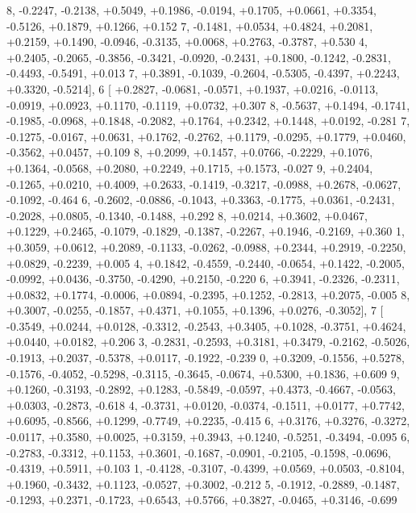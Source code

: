 \begin{DoxyCode}
      8, -0.2247, -0.2138, +0.5049, +0.1986, -0.0194, +0.1705, +0.0661, +0.3354, -0.5126, +0.1879, +0.1266, +0.152
      7, -0.1481, +0.0534, +0.4824, +0.2081, +0.2159, +0.1490, -0.0946, -0.3135, +0.0068, +0.2763, -0.3787, +0.530
      4, +0.2405, -0.2065, -0.3856, -0.3421, -0.0920, -0.2431, +0.1800, -0.1242, -0.2831, -0.4493, -0.5491, +0.013
      7, +0.3891, -0.1039, -0.2604, -0.5305, -0.4397, +0.2243, +0.3320, -0.5214],
6 [ +0.2827, -0.0681, -0.0571, +0.1937, +0.0216, -0.0113, -0.0919, +0.0923, +0.1170, -0.1119, +0.0732, +0.307
      8, -0.5637, +0.1494, -0.1741, -0.1985, -0.0968, +0.1848, -0.2082, +0.1764, +0.2342, +0.1448, +0.0192, -0.281
      7, -0.1275, -0.0167, +0.0631, +0.1762, -0.2762, +0.1179, -0.0295, +0.1779, +0.0460, -0.3562, +0.0457, +0.109
      8, +0.2099, +0.1457, +0.0766, -0.2229, +0.1076, +0.1364, -0.0568, +0.2080, +0.2249, +0.1715, +0.1573, -0.027
      9, +0.2404, -0.1265, +0.0210, +0.4009, +0.2633, -0.1419, -0.3217, -0.0988, +0.2678, -0.0627, -0.1092, -0.464
      6, -0.2602, -0.0886, -0.1043, +0.3363, -0.1775, +0.0361, -0.2431, -0.2028, +0.0805, -0.1340, -0.1488, +0.292
      8, +0.0214, +0.3602, +0.0467, +0.1229, +0.2465, -0.1079, -0.1829, -0.1387, -0.2267, +0.1946, -0.2169, +0.360
      1, +0.3059, +0.0612, +0.2089, -0.1133, -0.0262, -0.0988, +0.2344, +0.2919, -0.2250, +0.0829, -0.2239, +0.005
      4, +0.1842, -0.4559, -0.2440, -0.0654, +0.1422, -0.2005, -0.0992, +0.0436, -0.3750, -0.4290, +0.2150, -0.220
      6, +0.3941, -0.2326, -0.2311, +0.0832, +0.1774, -0.0006, +0.0894, -0.2395, +0.1252, -0.2813, +0.2075, -0.005
      8, +0.3007, -0.0255, -0.1857, +0.4371, +0.1055, +0.1396, +0.0276, -0.3052],
7 [ -0.3549, +0.0244, +0.0128, -0.3312, -0.2543, +0.3405, +0.1028, -0.3751, +0.4624, +0.0440, +0.0182, +0.206
      3, -0.2831, -0.2593, +0.3181, +0.3479, -0.2162, -0.5026, -0.1913, +0.2037, -0.5378, +0.0117, -0.1922, -0.239
      0, +0.3209, -0.1556, +0.5278, -0.1576, -0.4052, -0.5298, -0.3115, -0.3645, -0.0674, +0.5300, +0.1836, +0.609
      9, +0.1260, -0.3193, -0.2892, +0.1283, -0.5849, -0.0597, +0.4373, -0.4667, -0.0563, +0.0303, -0.2873, -0.618
      4, -0.3731, +0.0120, -0.0374, -0.1511, +0.0177, +0.7742, +0.6095, -0.8566, +0.1299, -0.7749, +0.2235, -0.415
      6, +0.3176, +0.3276, -0.3272, -0.0117, +0.3580, +0.0025, +0.3159, +0.3943, +0.1240, -0.5251, -0.3494, -0.095
      6, -0.2783, -0.3312, +0.1153, +0.3601, -0.1687, -0.0901, -0.2105, -0.1598, -0.0696, -0.4319, +0.5911, +0.103
      1, -0.4128, -0.3107, -0.4399, +0.0569, +0.0503, -0.8104, +0.1960, -0.3432, +0.1123, -0.0527, +0.3002, -0.212
      5, -0.1912, -0.2889, -0.1487, -0.1293, +0.2371, -0.1723, +0.6543, +0.5766, +0.3827, -0.0465, +0.3146, -0.699

\end{DoxyCode}
